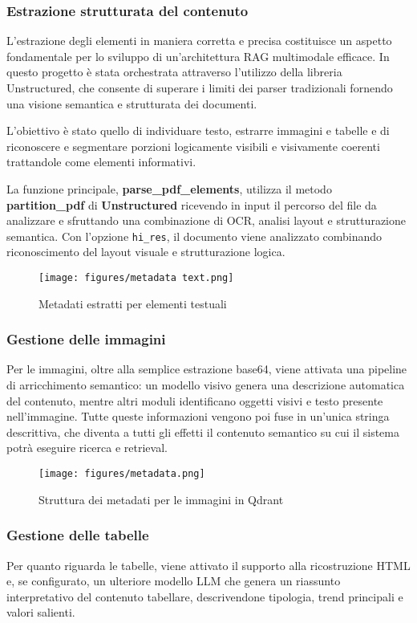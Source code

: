 \documentclass[12pt,a4paper]{article}
\begin{document}
\subsubsection{Estrazione strutturata del contenuto}
L'estrazione degli elementi in maniera corretta e precisa costituisce un aspetto fondamentale per lo sviluppo di un'architettura RAG multimodale efficace. In questo progetto è stata orchestrata attraverso l'utilizzo della libreria Unstructured, che consente di superare i limiti dei parser tradizionali fornendo una visione semantica e strutturata dei documenti.

L'obiettivo è stato quello di individuare testo, estrarre immagini e tabelle e di riconoscere e segmentare porzioni logicamente visibili e visivamente coerenti trattandole come elementi informativi.

La funzione principale, \textbf{parse\_pdf\_elements}, utilizza il metodo \textbf{partition\_pdf} di \textbf{Unstructured} ricevendo in input il percorso del file da analizzare e sfruttando una combinazione di OCR, analisi layout e strutturazione semantica. Con l'opzione \verb|hi_res|, il documento viene analizzato combinando riconoscimento del layout visuale e strutturazione logica.

\begin{figure}[!ht]
\centering
\texttt{[image: figures/metadata text.png]}
\caption{Metadati estratti per elementi testuali}
\label{fig:text_metadata}
\end{figure}

\subsubsection{Gestione delle immagini}
Per le immagini, oltre alla semplice estrazione base64, viene attivata una pipeline di arricchimento semantico: un modello visivo genera una descrizione automatica del contenuto, mentre altri moduli identificano oggetti visivi e testo presente nell'immagine. Tutte queste informazioni vengono poi fuse in un'unica stringa descrittiva, che diventa a tutti gli effetti il contenuto semantico su cui il sistema potrà eseguire ricerca e retrieval.

\begin{figure}[!ht]
\centering
\texttt{[image: figures/metadata.png]}
\caption{Struttura dei metadati per le immagini in Qdrant}
\label{fig:image_metadata}
\end{figure}

\subsubsection{Gestione delle tabelle}
Per quanto riguarda le tabelle, viene attivato il supporto alla ricostruzione HTML e, se configurato, un ulteriore modello LLM che genera un riassunto interpretativo del contenuto tabellare, descrivendone tipologia, trend principali e valori salienti.
\end{document}
